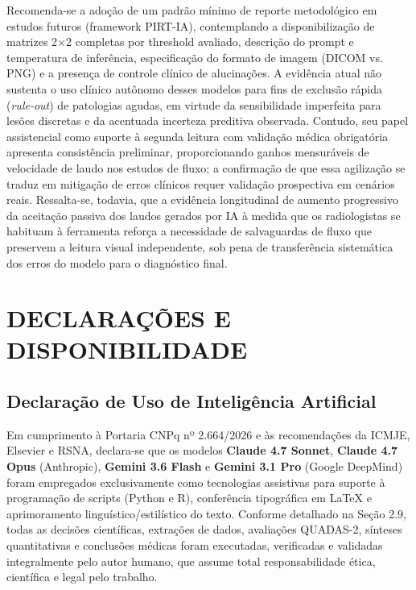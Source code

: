 \documentclass[12pt,a4paper]{article}
\begin{document}
Recomenda-se a adoção de um padrão mínimo de reporte metodológico em estudos futuros (framework PIRT-IA), contemplando a disponibilização de matrizes 2$\times$2 completas por threshold avaliado, descrição do prompt e temperatura de inferência, especificação do formato de imagem (DICOM vs. PNG) e a presença de controle clínico de alucinações. A evidência atual não sustenta o uso clínico autônomo desses modelos para fins de exclusão rápida (\textit{rule-out}) de patologias agudas, em virtude da sensibilidade imperfeita para lesões discretas e da acentuada incerteza preditiva observada. Contudo, seu papel assistencial como suporte à segunda leitura com validação médica obrigatória apresenta consistência preliminar, proporcionando ganhos mensuráveis de velocidade de laudo nos estudos de fluxo; a confirmação de que essa agilização se traduz em mitigação de erros clínicos requer validação prospectiva em cenários reais. Ressalta-se, todavia, que a evidência longitudinal de aumento progressivo da aceitação passiva dos laudos gerados por IA à medida que os radiologistas se habituam à ferramenta reforça a necessidade de salvaguardas de fluxo que preservem a leitura visual independente, sob pena de transferência sistemática dos erros do modelo para o diagnóstico final.

\newpage
\section*{DECLARAÇÕES E DISPONIBILIDADE}

\subsection*{Declaração de Uso de Inteligência Artificial}
Em cumprimento à Portaria CNPq nº 2.664/2026 e às recomendações da ICMJE, Elsevier e RSNA, declara-se que os modelos \textbf{Claude 4.7 Sonnet}, \textbf{Claude 4.7 Opus} (Anthropic), \textbf{Gemini 3.6 Flash} e \textbf{Gemini 3.1 Pro} (Google DeepMind) foram empregados exclusivamente como tecnologias assistivas para suporte à programação de scripts (Python e R), conferência tipográfica em LaTeX e aprimoramento linguístico/estilístico do texto. Conforme detalhado na Seção 2.9, todas as decisões científicas, extrações de dados, avaliações QUADAS-2, sínteses quantitativas e conclusões médicas foram executadas, verificadas e validadas integralmente pelo autor humano, que assume total responsabilidade ética, científica e legal pelo trabalho.
\end{document}
